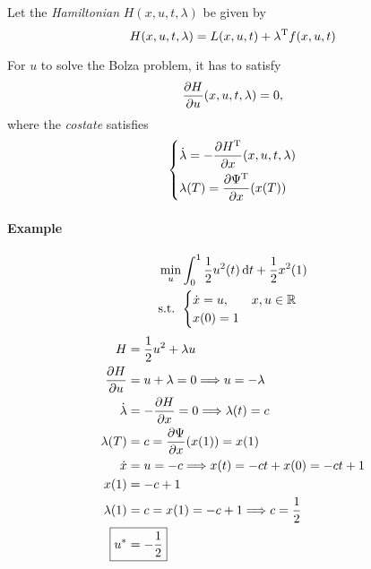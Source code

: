 \begin{framed}
  \begin{defi}
    Let the \emph{Hamiltonian} $H(x,u,t,\lambda)$ be given by
    \[ H(x,u,t,\lambda) = L(x,u,t) + \lambda^\text{T} f(x,u,t) \]
  \end{defi}
\end{framed}
\begin{thm}
  For $u$ to solve the Bolza problem, it has to satisfy
  \[ \frac{\partial H}{\partial u}(x,u,t,\lambda) = 0, \]
  where the \emph{costate} satisfies
  \[ \begin{dcases}
      \dot\lambda = - \frac{\partial H^\text{T}}{\partial x}(x,u,t,\lambda) \\
      \lambda(T) = \frac{\partial \Psi^\text{T}}{\partial x}(x(T))
    \end{dcases} \]
\end{thm}

\paragraph{Example} \mbox{}
\begin{align}
  & \min_u \int_0^1 \frac12 u^2(t) \mathop{}\!\mathrm{d} t + \frac12 x^2(1) \\
  & \text{s.t. } \begin{cases}
    \dot x = u, & x,u\in\mathbb{R} \\
    x(0) = 1
  \end{cases}
\end{align}
\begin{align}
  H &= \frac12 u^2 + \lambda u \\
  \pder{H}{u} &= u + \lambda = 0 \Longrightarrow u=-\lambda \\
  \dot\lambda &= -\pder{H}{x} = 0 \Longrightarrow \lambda(t) = c \\
  \lambda(T) &= c = \pder{\Psi}{x}(x(1)) = x(1) \\
  \dot x &= u = -c \Longrightarrow x(t) = -ct + x(0) = -ct + 1 \\
  x(1) &= -c + 1 \\
  \lambda(1) &= c = x(1) = -c + 1 \Longrightarrow c = \frac12 \\
  \Aboxed{u^* &= -\frac12}
\end{align}
\begin{center}
\end{center}

